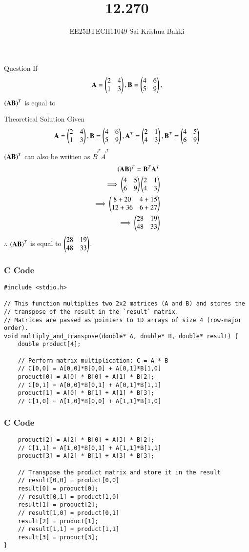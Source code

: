 \documentclass{beamer}
\title %
{12.270}
\author 
{EE25BTECH11049-Sai Krishna Bakki}
\begin{document}
\frame{\titlepage}
\begin{frame}{Question}
If
\begin{align*}
    \mathbf{A}=\begin{pmatrix}2&4\\1&3\end{pmatrix},\mathbf{B}=\begin{pmatrix}4&6\\5&9\end{pmatrix},
\end{align*}
$\left(\mathbf{A}\mathbf{B}\right)^T$ is equal to
\end{frame}
\begin{frame}{Theoretical Solution}
    Given
\begin{align}
    \mathbf{A}=\begin{pmatrix}2&4\\1&3\end{pmatrix},\mathbf{B}=\begin{pmatrix}4&6\\5&9\end{pmatrix},
    \mathbf{A}^T=\begin{pmatrix}2&1\\4&3\end{pmatrix},\mathbf{B}^T=\begin{pmatrix}4&5\\6&9\end{pmatrix}
\end{align}
$\left(\mathbf{A}\mathbf{B}\right)^T$ can also be written as $\vec{B}^T\vec{A}^T$
\begin{align}
    \left(\mathbf{A}\mathbf{B}\right)^T=\mathbf{B}^T\mathbf{A}^T\\
    \implies \begin{pmatrix}4&5\\6&9\end{pmatrix}\begin{pmatrix}2&1\\4&3\end{pmatrix}\\
    \implies\begin{pmatrix}8+20&4+15\\12+36&6+27\end{pmatrix}\\
    \implies \begin{pmatrix}28&19\\48&33\end{pmatrix}
\end{align}
$\therefore$ $ \left(\mathbf{A}\mathbf{B}\right)^T$ is equal to  $\begin{pmatrix}28&19\\48&33\end{pmatrix}$.
\end{frame}
\begin{frame}[fragile]
\frametitle{C Code}
\begin{lstlisting}
#include <stdio.h>

// This function multiplies two 2x2 matrices (A and B) and stores the
// transpose of the result in the `result` matrix.
// Matrices are passed as pointers to 1D arrays of size 4 (row-major order).
void multiply_and_transpose(double* A, double* B, double* result) {
    double product[4];

    // Perform matrix multiplication: C = A * B
    // C[0,0] = A[0,0]*B[0,0] + A[0,1]*B[1,0]
    product[0] = A[0] * B[0] + A[1] * B[2];
    // C[0,1] = A[0,0]*B[0,1] + A[0,1]*B[1,1]
    product[1] = A[0] * B[1] + A[1] * B[3];
    // C[1,0] = A[1,0]*B[0,0] + A[1,1]*B[1,0]
\end{lstlisting}
\end{frame}
\begin{frame}[fragile]
\frametitle{C Code}
\begin{lstlisting}
    product[2] = A[2] * B[0] + A[3] * B[2];
    // C[1,1] = A[1,0]*B[0,1] + A[1,1]*B[1,1]
    product[3] = A[2] * B[1] + A[3] * B[3];

    // Transpose the product matrix and store it in the result
    // result[0,0] = product[0,0]
    result[0] = product[0];
    // result[0,1] = product[1,0]
    result[1] = product[2];
    // result[1,0] = product[0,1]
    result[2] = product[1];
    // result[1,1] = product[1,1]
    result[3] = product[3];
}
\end{lstlisting}
\end{frame}
\end{document}
